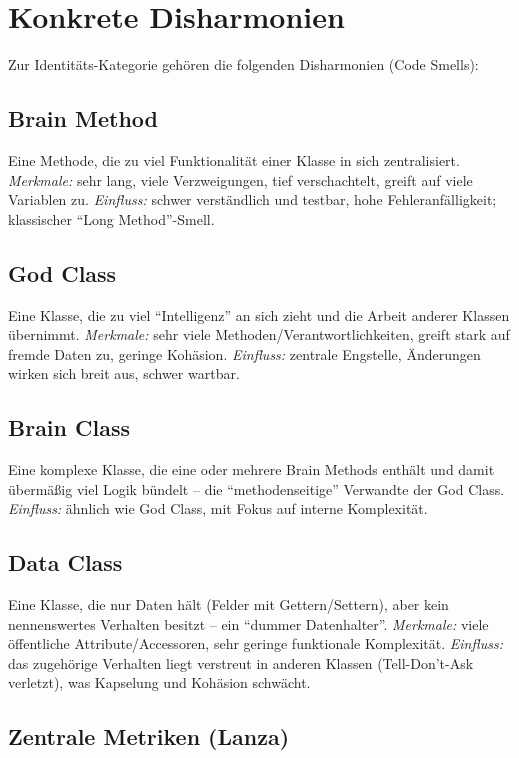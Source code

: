 \documentclass[
	fontsize=12pt,          %
	paper=a4,               %
	numbers=noenddot,       %
	listof=totoc,           %
	listof=entryprefix,     %
	listof=nochaptergap,    %
	bibliography=totoc,     %
	parskip=half,           %
	openany                 %
]{scrbook}
\begin{document}
\section*{Konkrete Disharmonien}

Zur Identitäts-Kategorie gehören die folgenden Disharmonien (Code Smells):

\subsection*{Brain Method}
Eine Methode, die zu viel Funktionalität einer Klasse in sich zentralisiert.
\emph{Merkmale:} sehr lang, viele Verzweigungen, tief verschachtelt, greift auf
viele Variablen zu. \emph{Einfluss:} schwer verständlich und testbar, hohe
Fehleranfälligkeit; klassischer ``Long Method''-Smell.

\subsection*{God Class}
Eine Klasse, die zu viel ``Intelligenz'' an sich zieht und die Arbeit anderer
Klassen übernimmt. \emph{Merkmale:} sehr viele Methoden/Verantwortlichkeiten,
greift stark auf fremde Daten zu, geringe Kohäsion. \emph{Einfluss:} zentrale
Engstelle, Änderungen wirken sich breit aus, schwer wartbar.

\subsection*{Brain Class}
Eine komplexe Klasse, die eine oder mehrere Brain Methods enthält und damit
übermäßig viel Logik bündelt -- die ``methodenseitige'' Verwandte der God Class.
\emph{Einfluss:} ähnlich wie God Class, mit Fokus auf interne Komplexität.

\subsection*{Data Class}
Eine Klasse, die nur Daten hält (Felder mit Gettern/Settern), aber kein
nennenswertes Verhalten besitzt -- ein ``dummer Datenhalter''.
\emph{Merkmale:} viele öffentliche Attribute/Accessoren, sehr geringe
funktionale Komplexität. \emph{Einfluss:} das zugehörige Verhalten liegt verstreut
in anderen Klassen (Tell-Don't-Ask verletzt), was Kapselung und Kohäsion
schwächt.

\subsection*{Zentrale Metriken (Lanza)}
\end{document}
